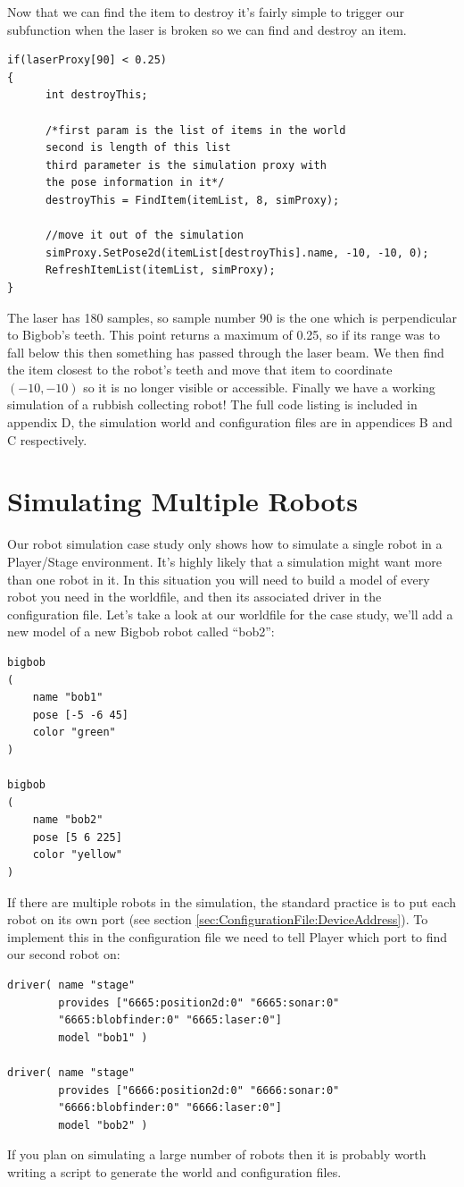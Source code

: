 \documentclass[a4paper]{report}
\newcommand{\plst}{Player/Stage\xspace}
\newcommand{\pl}{Player\xspace}
\begin{document}
Now that we can find the item to destroy it's fairly simple to trigger our subfunction when the laser is broken so we can find and destroy an item.
\begin{verbatim}
if(laserProxy[90] < 0.25)
{
      int destroyThis;

      /*first param is the list of items in the world
      second is length of this list
      third parameter is the simulation proxy with 
      the pose information in it*/
      destroyThis = FindItem(itemList, 8, simProxy);
 
      //move it out of the simulation
      simProxy.SetPose2d(itemList[destroyThis].name, -10, -10, 0);
      RefreshItemList(itemList, simProxy);
}
\end{verbatim}
The laser has 180 samples, so sample number 90 is the one which is perpendicular to Bigbob's teeth. This point returns a maximum of 0.25, so if its range was to fall below this then something has passed through the laser beam. We then find the item closest to the robot's teeth and move that item to coordinate $(-10, -10)$ so it is no longer visible or accessible.
\newline
Finally we have a working simulation of a rubbish collecting robot! The full code listing is included in appendix D, the simulation world and configuration files are in appendices B and C respectively.

\section{Simulating Multiple Robots}
Our robot simulation case study only shows how to simulate a single robot in a \plst environment. It's highly likely that a simulation might want more than one robot in it. In this situation you will need to build a model of every robot you need in the worldfile, and then its associated driver in the configuration file. Let's take a look at our worldfile for the case study, we'll add a new model of a new Bigbob robot called ``bob2'':
\begin{verbatim}
bigbob
(
	name "bob1"
	pose [-5 -6 45]
	color "green"
)

bigbob
(
	name "bob2"
	pose [5 6 225]
	color "yellow"
)
\end{verbatim}
If there are multiple robots in the simulation, the standard practice is to put each robot on its own port (see section \ref{sec:ConfigurationFile:DeviceAddress}). To implement this in the configuration file we need to tell \pl which port to find our second robot on:
\begin{verbatim}
driver( name "stage" 
        provides ["6665:position2d:0" "6665:sonar:0" 
        "6665:blobfinder:0" "6665:laser:0"] 
        model "bob1" )

driver( name "stage" 
        provides ["6666:position2d:0" "6666:sonar:0" 
        "6666:blobfinder:0" "6666:laser:0"] 
        model "bob2" )
\end{verbatim}
If you plan on simulating a large number of robots then it is probably worth writing a script to generate the world and configuration files.
\end{document}
